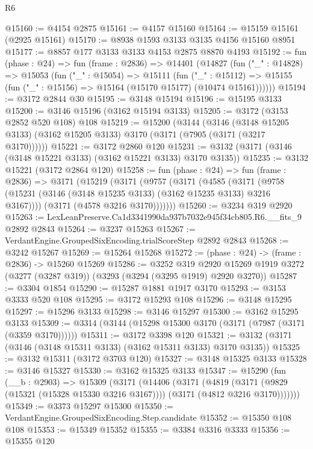 \begin{lexlean}{R6}
\begin{coremodule}
@15160 := @4154 @2875
@15161 := @4157 @15160
@15164 := @15159 @15161 (@2925 @15161)
@15170 := @8938 @1593 @3133 @3135 @4156 @15160 @8951
@15177 := @8857 @177 @3133 @3133 @4153 @2875 @8870 @4193
@15192 := fun (phase : @24) =>
  fun (frame : @2836) =>
  @14401
    (@14827
      (fun ("_" : @14828) =>
      @15053
        (fun ("_" : @15054) =>
        @15111
          (fun ("_" : @15112) =>
          @15155 (fun ("_" : @15156) => @15164 (@15170 @15177) (@10474 @15161))))))
@15194 := @3172 @2844 @30
@15195 := @3148 @15194
@15196 := @15195 @3133
@15200 := @3146 @15196 (@3162 @15194 @3133)
@15205 := @3172 (@3153 @2852 @520 @108) @108
@15219 := @15200
    (@3144
      (@3146 (@3148 @15205 @3133) (@3162 @15205 @3133) @3170 (@3171 (@7905 (@3171 (@3217 @3170))))))
@15221 := @3172 @2860 @120
@15231 := @3132 (@3171 (@3146 (@3148 @15221 @3133) (@3162 @15221 @3133) @3170 @3135))
@15235 := @3132 @15221 (@3172 @2864 @120)
@15258 := fun (phase : @24) =>
  fun (frame : @2836) =>
  @3171
    (@15219
      (@3171
        (@9757
          (@3171
            (@4585
              (@3171 (@9758 (@15231 (@3146 (@3148 @15235 @3133) (@3162 @15235 @3133) @3216 @3167))))
              (@3171 (@4578 @3216 @3170)))))))
@15260 := @3234 @319 @2920
@15263 := LexLeanPreserve.Ca1d3341990da937b7032e945f34cb805.R6.__fits_9 @2892 @2843
@15264 := @3237 @15263
@15267 := VerdantEngine.GroupedSixEncoding.trialScoreStep @2892 @2843
@15268 := @3242 @15267
@15269 := @15264 @15268
@15272 := (phase : @24) -> (frame : @2836) -> @15260 @15269
@15286 := @3252
    @319
    @2920
    @15269
    @1919
    @3272
    (@3277 (@3287 @319))
    (@3293 (@3294 (@3295 @1919) @2920 @3270))
@15287 := @3304 @1854
@15290 := @15287 @1881 @1917 @3170
@15293 := @3153 @3333 @520 @108
@15295 := @3172 @15293 @108
@15296 := @3148 @15295
@15297 := @15296 @3133
@15298 := @3146 @15297
@15300 := @3162 @15295 @3133
@15309 := @3314 (@3144 (@15298 @15300 @3170 (@3171 (@7987 (@3171 (@3359 @3170))))))
@15311 := @3172 @3398 @120
@15321 := @3132 (@3171 (@3146 (@3148 @15311 @3133) (@3162 @15311 @3133) @3170 @3135))
@15325 := @3132 @15311 (@3172 @3703 @120)
@15327 := @3148 @15325 @3133
@15328 := @3146 @15327
@15330 := @3162 @15325 @3133
@15347 := @15290
    (fun (__b : @2903) =>
    @15309
      (@3171
        (@14406
          (@3171
            (@4819
              (@3171 (@9829 (@15321 (@15328 @15330 @3216 @3167))))
              (@3171 (@4812 @3216 @3170)))))))
@15349 := @3373 @15297 @15300
@15350 := VerdantEngine.GroupedSixEncoding.Step.candidate
@15352 := @15350 @108 @108
@15353 := @15349 @15352
@15355 := @3384 @3316 @3333
@15356 := @15355 @120

\end{coremodule}
\end{lexlean}
